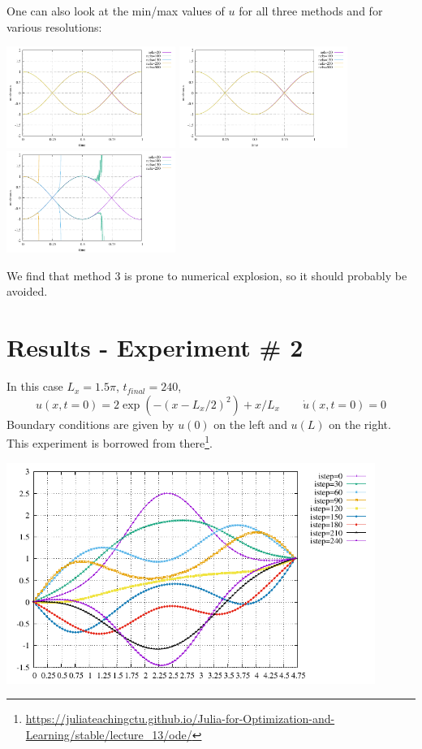 One can also look at the min/max values of $u$ for all three methods and 
for various resolutions:
\begin{center}
\includegraphics[width=5.5cm]{python_codes/fieldstone_164/results1/stats_meth1.pdf}
\includegraphics[width=5.5cm]{python_codes/fieldstone_164/results1/stats_meth2.pdf}
\includegraphics[width=5.5cm]{python_codes/fieldstone_164/results1/stats_meth3.pdf}
\end{center}
We find that method 3 is prone to numerical explosion, so
it should probably be avoided.

\section*{Results - Experiment \# 2}

In this case $L_x=1.5\pi$, $t_{final}=240$, 
\[
u(x,t=0)=2 \exp\left(-(x-L_x/2)^2 \right)+x/L_x
\qquad
\dot{u}(x,t=0)=0 
\]
Boundary conditions are given by $u(0)$ on the left and $u(L)$ on the right.
This experiment is borrowed from there\footnote{\url{https://juliateachingctu.github.io/Julia-for-Optimization-and-Learning/stable/lecture_13/ode/}}.

\begin{center}
\includegraphics[width=12cm]{python_codes/fieldstone_164/results2/u.pdf}
\end{center}




